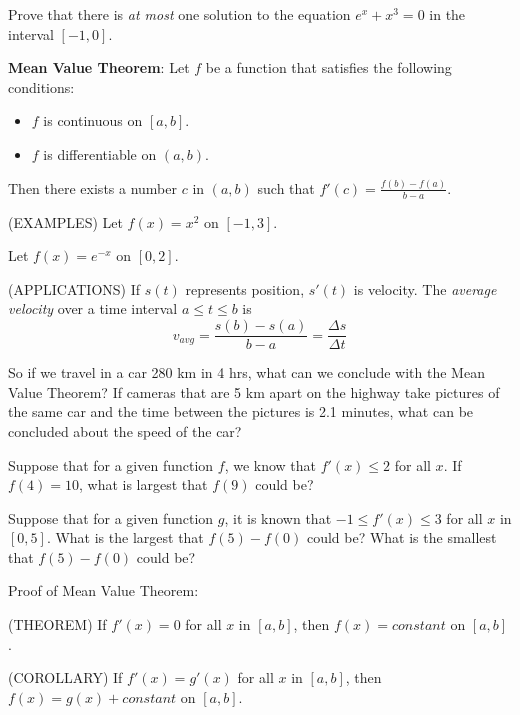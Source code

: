 \documentclass[11pt]{article}
\begin{document}
Prove that there is \emph{at most} one solution to the equation $e^x+x^3 = 0$ in the interval $[-1,0]$.


\pagebreak

{\bf Mean Value Theorem}:
Let $f$ be a function that satisfies the following conditions:

\begin{itemize}
\item{$f$ is continuous on $[a,b]$.}
\item{$f$ is differentiable on $(a,b)$.}
  \end{itemize}

Then there exists a number $c$ in $(a,b)$ such that $f'(c)=\frac{f(b)-f(a)}{b-a}$.

\vspace{2in}




(EXAMPLES)
Let $f(x) = x^2$ on $[-1,3]$.


\vspace{2in}


Let $f(x) = e^{-x}$ on $[0,2]$.


\vspace{1in}

\pagebreak

(APPLICATIONS)
If $s(t)$ represents position, $s'(t)$ is velocity.  The \emph{average velocity} over a time interval $a\leq t \leq b$ is
\begin{displaymath}
v_{avg}=\frac{s(b)-s(a)}{b-a} = \frac{\Delta s}{\Delta t}
  \end{displaymath}

So if we travel in a car 280 km in 4 hrs, what can we conclude with the Mean Value Theorem?
\vspace{0.2in}
If cameras that are 5 km apart on the highway take pictures of the same car and the time between the pictures is 2.1 minutes, what
can be concluded about the speed of the car?

\vspace{1in}


Suppose that for a given function $f$, we know that $f'(x)\leq 2$ for all $x$.  If $f(4)=10$, what is largest that $f(9)$ could be?

\vspace{1.5in}

Suppose that for a given function $g$, it is known that $-1\leq f'(x) \leq 3$ for all $x$ in $[0,5]$.  What is the largest that $f(5)-f(0)$ could be?
What is the smallest that $f(5)-f(0)$ could be?

\vspace{1.5in}

Proof of Mean Value Theorem:


\pagebreak

(THEOREM)  If $f'(x)=0$ for all $x$ in $[a,b]$, then $f(x) = constant$ on $[a,b]$.

\vspace{2in}


(COROLLARY)  If $f'(x)=g'(x)$ for all $x$ in $[a,b]$, then $f(x) = g(x) + constant$ on $[a,b]$.
\end{document}
